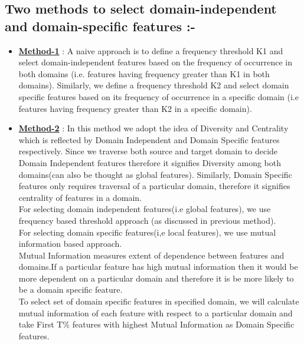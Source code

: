 \documentclass{report}
\begin{document}
\subsection{Two methods to select domain-independent and domain-specific features :-} 
\begin{itemize}
\item \underline{\textbf{Method-1}} : A naive approach is to define a frequency threshold K1 and select domain-independent features based on the frequency of occurrence in both domains (i.e. features having frequency greater than K1 in both domains). Similarly, we define a frequency threshold K2 and select domain specific features based on its frequency of occurrence in a specific domain (i.e features having frequency greater than K2 in a specific domain).
\item \underline{\textbf{Method-2}} : In this method we adopt the idea of Diversity and Centrality which is reflected by Domain Independent and Domain Specific features respectively. Since we traverse both source and target domain to decide Domain Independent features therefore it signifies Diversity among both domains(can also be thought as global features). Similarly, Domain Specific features only requires traversal of a particular domain, therefore it signifies centrality of features in a domain.\\
For selecting domain independent features(i.e global features), we use frequency based threshold approach (as discussed in previous method).\\
For selecting domain specific features(i,e local features), we use mutual information based approach.\\
Mutual Information measures extent of dependence between features and domains.If a particular feature has high mutual information then it would be more dependent on a particular domain and therefore it is be more likely to be a domain specific feature.\\
To select set of domain specific features in specified domain, we will calculate mutual information of each feature with respect to a particular domain and take First T\% features with highest Mutual Information as Domain Specific features.\\

\end{itemize}

\begin{center}
\end{center}
\end{document}
